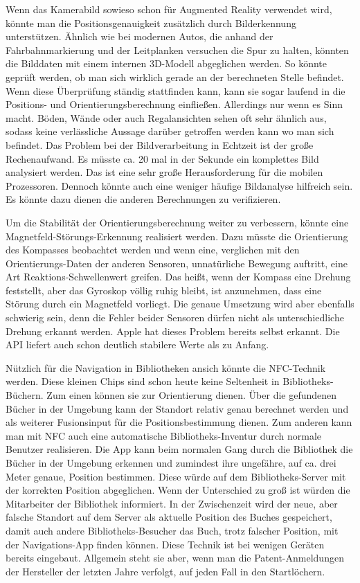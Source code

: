 Wenn das Kamerabild sowieso schon für Augmented Reality verwendet wird, könnte man die Positionsgenauigkeit zusätzlich durch Bilderkennung unterstützen. Ähnlich wie bei modernen Autos, die anhand der Fahrbahnmarkierung und der Leitplanken versuchen die Spur zu halten, könnten die Bilddaten mit einem internen 3D-Modell abgeglichen werden. So könnte geprüft werden, ob man sich wirklich gerade an der berechneten Stelle befindet. Wenn diese Überprüfung ständig stattfinden kann, kann sie sogar laufend in die Positions- und Orientierungsberechnung einfließen. Allerdings nur wenn es Sinn macht. Böden, Wände oder auch Regalansichten sehen oft sehr ähnlich aus, sodass keine verlässliche Aussage darüber getroffen werden kann wo man sich befindet.
Das Problem bei der Bildverarbeitung in Echtzeit ist der große Rechenaufwand. Es müsste ca. 20 mal in der Sekunde ein komplettes Bild analysiert werden. Das ist eine sehr große Herausforderung für die mobilen Prozessoren. Dennoch könnte auch eine weniger häufige Bildanalyse hilfreich sein. Es könnte dazu dienen die anderen Berechnungen zu verifizieren.

Um die Stabilität der Orientierungsberechnung weiter zu verbessern, könnte eine Magnetfeld-Störungs-Erkennung realisiert werden. Dazu müsste die Orientierung des Kompasses beobachtet werden und wenn eine, verglichen mit den Orientierungs-Daten der anderen Sensoren, unnatürliche Bewegung auftritt, eine Art Reaktions-Schwellenwert greifen. Das heißt, wenn der Kompass eine Drehung feststellt, aber das Gyroskop völlig ruhig bleibt, ist anzunehmen, dass eine Störung durch ein Magnetfeld vorliegt. Die genaue Umsetzung wird aber ebenfalls schwierig sein, denn die Fehler beider Sensoren dürfen nicht als unterschiedliche Drehung erkannt werden. Apple hat dieses Problem bereits selbst erkannt. Die API liefert auch schon deutlich stabilere Werte als zu Anfang.

Nützlich für die Navigation in Bibliotheken ansich könnte die NFC-Technik werden. Diese kleinen Chips sind schon heute keine Seltenheit in Bibliotheks-Büchern. Zum einen können sie zur Orientierung dienen. Über die gefundenen Bücher in der Umgebung kann der Standort relativ genau berechnet werden und als weiterer Fusionsinput für die Positionsbestimmung dienen. Zum anderen kann man mit NFC auch eine automatische Bibliotheks-Inventur durch normale Benutzer realisieren. Die App kann beim normalen Gang durch die Bibliothek die Bücher in der Umgebung erkennen und zumindest ihre ungefähre, auf ca. drei Meter genaue, Position bestimmen. Diese würde auf dem Bibliotheks-Server mit der korrekten Position abgeglichen. Wenn der Unterschied zu groß ist würden die Mitarbeiter der Bibliothek informiert. In der Zwischenzeit wird der neue, aber falsche Standort auf dem Server als aktuelle Position des Buches gespeichert, damit auch andere Bibliotheks-Besucher das Buch, trotz falscher Position, mit der Navigations-App finden können. Diese Technik ist bei wenigen Geräten bereits eingebaut. Allgemein steht sie aber, wenn man die Patent-Anmeldungen der Hersteller der letzten Jahre verfolgt, auf jeden Fall in den Startlöchern. \cite{wiki:006}

